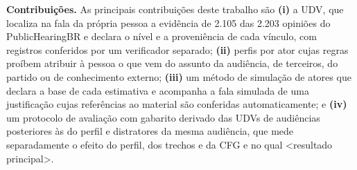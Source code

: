 \medskip\noindent\textbf{Contribui\c{c}\~oes.} As principais contribuições deste trabalho são
\textbf{(i)} a UDV, que localiza na fala da própria pessoa a evidência de 2.105 das 2.203 opiniões
do PublicHearingBR e declara o nível e a proveniência de cada vínculo, com registros conferidos por
um verificador separado; \textbf{(ii)} perfis por ator cujas regras proíbem atribuir à pessoa o que
vem do assunto da audiência, de terceiros, do partido ou de conhecimento externo; \textbf{(iii)} um
método de simulação de atores que declara a base de cada estimativa e acompanha a fala simulada de
uma justificação cujas referências ao material são conferidas automaticamente; e \textbf{(iv)} um
protocolo de avaliação com gabarito derivado das UDVs de audiências posteriores às do perfil e
distratores da mesma audiência, que mede separadamente o efeito do perfil, dos trechos e da CFG e
no qual <resultado principal>.
